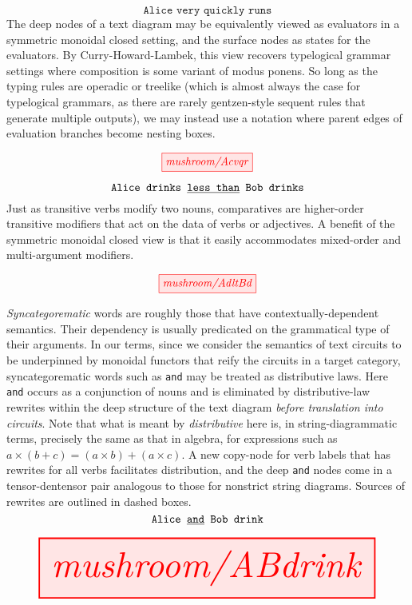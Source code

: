 \begin{myboxB}
\begin{example}\label{ex:intensifiers}
\[\texttt{Alice very quickly runs}\]
The deep nodes of a text diagram may be equivalently viewed as evaluators in a symmetric monoidal closed setting, and the surface nodes as states for the evaluators. By Curry-Howard-Lambek, this view recovers typelogical grammar settings where composition is some variant of modus ponens. So long as the typing rules are operadic or treelike (which is almost always the case for typelogical grammars, as there are rarely gentzen-style sequent rules that generate multiple outputs), we may instead use a notation where parent edges of evaluation branches become nesting boxes.
\end{example}
\[\tikzfig{mushroom/Acvqr}\]
\end{myboxB}

\begin{myboxB}
\begin{example}\label{ex:comparatives}
\[\texttt{Alice drinks \underline{less than} Bob drinks}\]
Just as transitive verbs modify two nouns, comparatives are higher-order transitive modifiers that act on the data of verbs or adjectives. A benefit of the symmetric monoidal closed view is that it easily accommodates mixed-order and multi-argument modifiers.
\end{example}
\[\tikzfig{mushroom/AdltBd}\]
\end{myboxB}

\begin{myboxR}
\begin{example}\label{ex:syncat1}
\emph{Syncategorematic} words are roughly those that have contextually-dependent semantics. Their dependency is usually predicated on the grammatical type of their arguments. In our terms, since we consider the semantics of text circuits to be underpinned by monoidal functors that reify the circuits in a target category, syncategorematic words such as \texttt{and} may be treated as distributive laws. Here \texttt{and} occurs as a conjunction of nouns and is eliminated by distributive-law rewrites within the deep structure of the text diagram \emph{before translation into circuits}. Note that what is meant by \emph{distributive} here is, in string-diagrammatic terms, precisely the same as that in algebra, for expressions such as $a \times (b + c) = (a \times b) + (a \times c)$. A new copy-node for verb labels that has rewrites for all verbs facilitates distribution, and the deep \texttt{and} nodes come in a tensor-dentensor pair analogous to those for nonstrict string diagrams. Sources of rewrites are outlined in dashed boxes.
\[\texttt{Alice \underline{and} Bob drink}\]
\end{example}
\[\resizebox{\textwidth}{!}{\tikzfig{mushroom/ABdrink}}\]
\end{myboxR}
\clearpage
\newpage


